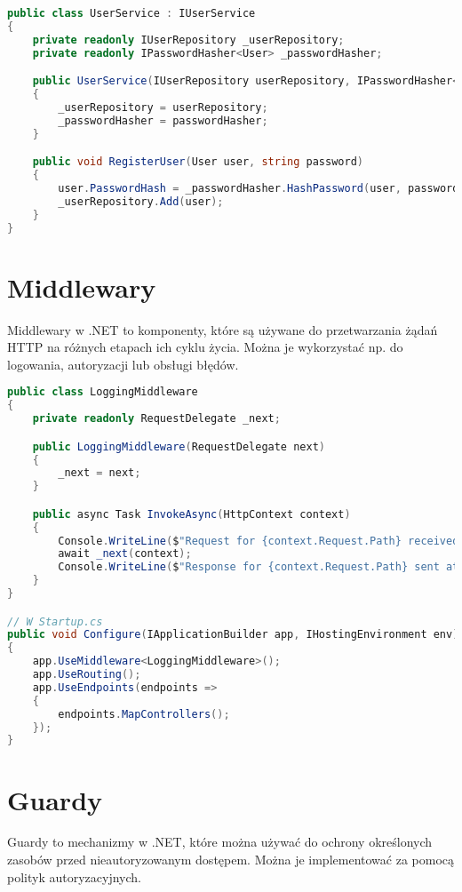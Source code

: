 \documentclass[a4paper,12pt]{article}
\begin{document}
\begin{lstlisting}[language=C#, caption=Przykład hashowania hasła]
public class UserService : IUserService
{
    private readonly IUserRepository _userRepository;
    private readonly IPasswordHasher<User> _passwordHasher;

    public UserService(IUserRepository userRepository, IPasswordHasher<User> passwordHasher)
    {
        _userRepository = userRepository;
        _passwordHasher = passwordHasher;
    }

    public void RegisterUser(User user, string password)
    {
        user.PasswordHash = _passwordHasher.HashPassword(user, password);
        _userRepository.Add(user);
    }
}
\end{lstlisting}

\section{Middlewary}
Middlewary w .NET to komponenty, które są używane do przetwarzania żądań HTTP na różnych etapach ich cyklu życia. Można je wykorzystać np. do logowania, autoryzacji lub obsługi błędów.

\begin{lstlisting}[language=C#, caption=Przykład tworzenia middleware]
public class LoggingMiddleware
{
    private readonly RequestDelegate _next;

    public LoggingMiddleware(RequestDelegate next)
    {
        _next = next;
    }

    public async Task InvokeAsync(HttpContext context)
    {
        Console.WriteLine($"Request for {context.Request.Path} received at {DateTime.Now}");
        await _next(context);
        Console.WriteLine($"Response for {context.Request.Path} sent at {DateTime.Now}");
    }
}

// W Startup.cs
public void Configure(IApplicationBuilder app, IHostingEnvironment env)
{
    app.UseMiddleware<LoggingMiddleware>();
    app.UseRouting();
    app.UseEndpoints(endpoints =>
    {
        endpoints.MapControllers();
    });
}
\end{lstlisting}

\section{Guardy}
Guardy to mechanizmy w .NET, które można używać do ochrony określonych zasobów przed nieautoryzowanym dostępem. Można je implementować za pomocą polityk autoryzacyjnych.
\end{document}
